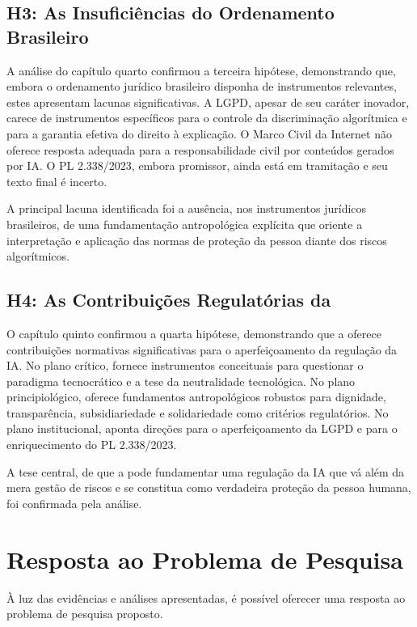 \subsection{H3: As Insuficiências do Ordenamento Brasileiro}
\label{subsec:verificacao-h3}

A análise do capítulo quarto confirmou a terceira hipótese, demonstrando que, embora o ordenamento jurídico brasileiro disponha de instrumentos relevantes, estes apresentam lacunas significativas. A LGPD, apesar de seu caráter inovador, carece de instrumentos específicos para o controle da discriminação algorítmica e para a garantia efetiva do direito à explicação. O Marco Civil da Internet não oferece resposta adequada para a responsabilidade civil por conteúdos gerados por IA. O PL 2.338/2023, embora promissor, ainda está em tramitação e seu texto final é incerto.

A principal lacuna identificada foi a ausência, nos instrumentos jurídicos brasileiros, de uma fundamentação antropológica explícita que oriente a interpretação e aplicação das normas de proteção da pessoa diante dos riscos algorítmicos.

\subsection{H4: As Contribuições Regulatórias da \MH{}}
\label{subsec:verificacao-h4}

O capítulo quinto confirmou a quarta hipótese, demonstrando que a \MH{} oferece contribuições normativas significativas para o aperfeiçoamento da regulação da IA. No plano crítico, fornece instrumentos conceituais para questionar o paradigma tecnocrático e a tese da neutralidade tecnológica. No plano principiológico, oferece fundamentos antropológicos robustos para dignidade, transparência, subsidiariedade e solidariedade como critérios regulatórios. No plano institucional, aponta direções para o aperfeiçoamento da LGPD e para o enriquecimento do PL 2.338/2023.

A tese central, de que a \MH{} pode fundamentar uma regulação da IA que vá além da mera gestão de riscos e se constitua como verdadeira proteção da pessoa humana, foi confirmada pela análise.

\section{Resposta ao Problema de Pesquisa}
\label{sec:resposta-problema}

À luz das evidências e análises apresentadas, é possível oferecer uma resposta ao problema de pesquisa proposto.


